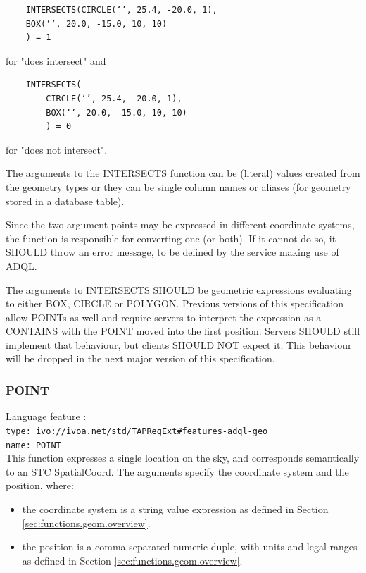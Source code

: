 \documentclass[11pt,a4paper]{ivoa}
\begin{document}
\begin{verbatim}
    INTERSECTS(CIRCLE(‘’, 25.4, -20.0, 1),
    BOX(‘’, 20.0, -15.0, 10, 10)
    ) = 1
\end{verbatim}

for "does intersect" and

\begin{verbatim}
    INTERSECTS(
        CIRCLE(‘’, 25.4, -20.0, 1),
        BOX(‘’, 20.0, -15.0, 10, 10)
        ) = 0
\end{verbatim}

for "does not intersect".

The arguments to the INTERSECTS function can be (literal) values created from
the geometry types or they can be single column names or aliases (for geometry
stored in a database table).

Since the two argument points may be expressed in different coordinate
systems, the function is responsible for converting one (or both). If it
cannot do so, it SHOULD throw an error message, to be defined by the service
making use of ADQL.

The arguments to INTERSECTS SHOULD be geometric expressions evaluating to
either BOX, CIRCLE or POLYGON.
Previous versions of this
specification allow POINTs as well and require servers to interpret the
expression as a CONTAINS with the POINT moved into the first position. Servers
SHOULD still implement that behaviour, but clients SHOULD NOT expect it. This
behaviour will be dropped in the next major version of this specification.

\subsubsection{POINT}
\label{sec:functions.geom.point}
{\footnotesize Language feature :}\\
{\footnotesize \verb|type: ivo://ivoa.net/std/TAPRegExt#features-adql-geo|}\\
{\footnotesize \verb|name: POINT|}\\

This function expresses a single location on the sky, and corresponds
semantically to an STC SpatialCoord. The arguments
specify the coordinate system and the position, where:

\begin{itemize}
    \item the coordinate system is a string value expression as defined in Section \ref{sec:functions.geom.overview}.
    \item the position is a comma separated numeric duple, with units and legal ranges as defined in Section \ref{sec:functions.geom.overview}.
\end{itemize}
\end{document}
